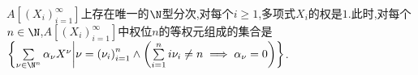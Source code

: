 \begin{example}{}{}
	$A\left[\left(X_{i}\right)_{i=1}^{\infty}\right]$上存在唯一的$\N$型分次,对每个$i\geq 1$,多项式$X_{i}$的权是$1$.此时,对每个$n\in\N$,$A\left[\left(X_{i}\right)_{i=1}^{\infty}\right]$中权位$n$的等权元组成的集合是$\left\{\sum\limits_{\nu\in\N^{n}}\alpha_{\nu}X^{\nu}\middle|\nu=\left(\nu_{i}\right)_{i=1}^{n}\wedge\left(\sum\limits_{i=1}^{n}i\nu_{i}\neq n\implies\alpha_{\nu}=0\right)\right\}$.
\end{example}